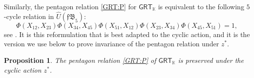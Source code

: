 \documentclass{amsart}
\newcommand{\kk}{\mathbb{K}}    %
\newcommand{\PaRB}{\mathsf{PaRB}}
\newcommand{\lrar}{\ensuremath{\longrightarrow}}
\newcommand{\GT}{{\mathsf{GT}}}
\newcommand{\GRT}{{\mathsf{GRT}}}
\newcommand{\PB}{\mathsf{PB}} %
\newtheorem{prop}[theorem]{Proposition}%
\theoremstyle{definition}
\numberwithin{equation}{section}
\begin{document}
Similarly, the pentagon relation \eqref{GRT:P} for $\GRT_{\kk}$ is equivalent to the following $5$-cycle relation in $\hat U(\mathfrak{fB}_5)$:
\[
\Phi(X_{12}, X_{23})  \Phi(X_{34}, X_{45})  \Phi(X_{51}, X_{12})  \Phi(X_{23}, X_{34})  \Phi(X_{45}, X_{51}) = 1, 
\]
see \cite[Lemma 5]{Furusho_pentagon}. It is this reformulation that is best adapted to the cyclic action, and it is the version we use below to prove invariance of the pentagon relation under $z^*$.


\begin{prop}\label{prop: cyclic GRT on (P)}
The pentagon relation \eqref{GRT:P} of $\GRT_{\kk}$ is preserved under the cyclic action $z^*$.
\end{prop}
\end{document}
